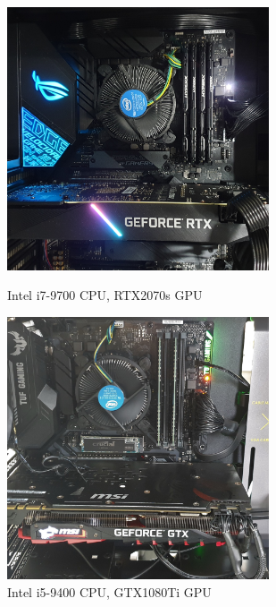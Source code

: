 \documentclass[8pt,a4paper]{article}
\begin{document}

\begin{figure}[H]
    \begin{minipage}[t]{0.5\textwidth}
    \begin{center}
        \includegraphics[width=220pt]{./Figures/RTX2070s}
        \caption{Intel i7-9700 CPU, RTX2070s GPU}
        \label{fig:our_GPU}
    \end{center}    
    \end{minipage}    
    \begin{minipage}[t]{0.5\textwidth}
    \begin{center}
        \includegraphics[width=220pt]{./Figures/GTX1080Ti.jpg}
        \caption{Intel i5-9400 CPU, GTX1080Ti GPU}
        \label{fig:my_GPU}
    \end{center}    
    \end{minipage}
\end{figure}
\end{document}
